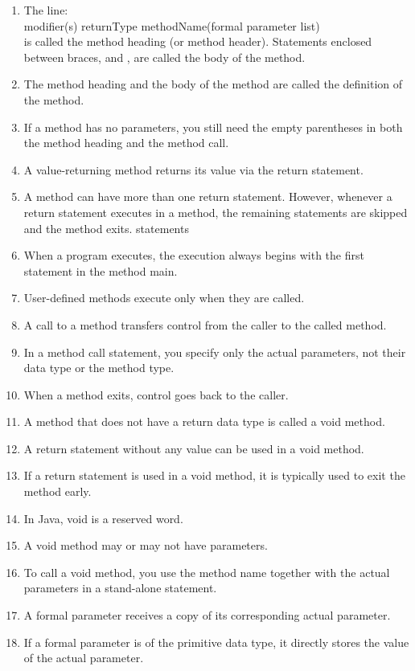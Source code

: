 \documentclass[12pt,a4paper,final,twoside,onecolumn,titlepage]{book}
\begin{document}
\begin{enumerate}
\begin{lstlisting}
{
}
\end{lstlisting}
\item The line: \\
modifier(s) returnType methodName(formal parameter list)\\
is called the method heading (or method header). Statements enclosed between braces, { and }, are called the body of the method.
\item The method heading and the body of the method are called the definition of the method.
\item If a method has no parameters, you still need the empty parentheses in both the method heading and the method call.
\item A value-returning method returns its value via the return statement.
\item A method can have more than one return statement. However, whenever a return statement executes in a method, the remaining statements are skipped and the method exits.
statements
\item When a program executes, the execution always begins with the first statement in the method main.
\item User-defined methods execute only when they are called.
\item A call to a method transfers control from the caller to the called method.
\item In a method call statement, you specify only the actual parameters, not their data type or the method type.
\item When a method exits, control goes back to the caller.
\item A method that does not have a return data type is called a void method.
\item A return statement without any value can be used in a void method.
\item If a return statement is used in a void method, it is typically used to exit the method early.
\item In Java, void is a reserved word.
\item A void method may or may not have parameters.
\item To call a void method, you use the method name together with the actual parameters in a stand-alone statement.
\item A formal parameter receives a copy of its corresponding actual parameter.
\item If a formal parameter is of the primitive data type, it directly stores the value of the actual parameter.

\end{enumerate}
\end{document}
